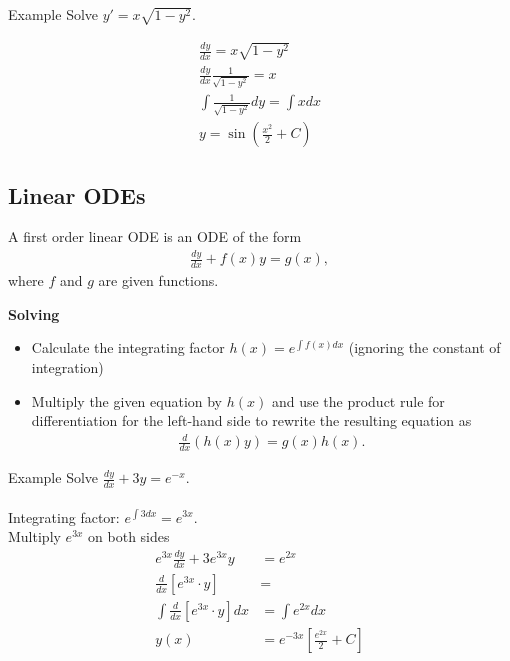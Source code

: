 \documentclass{report}
\begin{document}
		\begin{question}{Example}
			Solve $y' = x \sqrt{1 - y^2}$.

			\begin{align*}
				\frac{dy}{dx} = x \sqrt{1 - y^2}	\\
				\frac{dy}{dx} \frac{1}{\sqrt{1 - y^2}}  = x	\\
				\int \frac{1}{\sqrt{1 - y^2}} dy = \int x dx	\\
				y = \sin\left(\frac{x^2}{2} + C\right)
			\end{align*}
		\end{question}
	
	\subsection{Linear ODEs}

		A first order linear ODE is an ODE of the form
		\begin{align*}
			\frac{dy}{dx} + f(x)y = g(x),
		\end{align*}
		where $f$ and $g$ are given functions.

		\textbf{Solving}
		\begin{itemize}
			\item Calculate the integrating factor $h(x) = e ^{\int f(x)dx}$ (ignoring the constant of integration)
			\item Multiply the given equation by $h(x)$ and use the product rule for differentiation for the left-hand side to rewrite the resulting equation as
				\begin{align*}
					\frac{d}{dx} (h(x)y) = g(x)h(x).
				\end{align*}
		\end{itemize}

		\begin{question}{Example}
			Solve $\frac{dy}{dx} + 3y = e^{-x}$.
			\\ \\
			Integrating factor: $e^{\int 3 dx} = e^{3x}$.	\\
			Multiply $e^{3x}$ on both sides
			\begin{align*}
				e^{3x}\frac{dy}{dx} + 3e^{3x}y &= e^{2x}	\\
				\frac{d}{dx} \left[e^{3x} \cdot y\right] &=	\\
				\int \frac{d}{dx} \left[e^{3x}\cdot y\right] dx &= \int e^{2x} dx	\\
				y(x) &= e^{-3x} \left[\frac{e^{2x}}{2} + C\right]
			\end{align*}

		\end{question}
\end{document}

